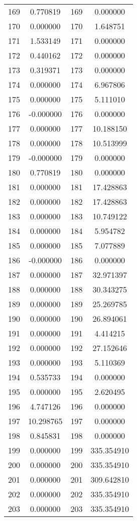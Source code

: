 \documentclass[12pt]{article}
\begin{document}
\begin{longtable}{@{}cccc@{}}
169 & 0.770819 & 169 & 0.000000 \\
170 & 0.000000 & 170 & 1.648751 \\
171 & 1.533149 & 171 & 0.000000 \\
172 & 0.440162 & 172 & 0.000000 \\
173 & 0.319371 & 173 & 0.000000 \\
174 & 0.000000 & 174 & 6.967806 \\
175 & 0.000000 & 175 & 5.111010 \\
176 & -0.000000 & 176 & 0.000000 \\
177 & 0.000000 & 177 & 10.188150 \\
178 & 0.000000 & 178 & 10.513999 \\
179 & -0.000000 & 179 & 0.000000 \\
180 & 0.770819 & 180 & 0.000000 \\
181 & 0.000000 & 181 & 17.428863 \\
182 & 0.000000 & 182 & 17.428863 \\
183 & 0.000000 & 183 & 10.749122 \\
184 & 0.000000 & 184 & 5.954782 \\
185 & 0.000000 & 185 & 7.077889 \\
186 & -0.000000 & 186 & 0.000000 \\
187 & 0.000000 & 187 & 32.971397 \\
188 & 0.000000 & 188 & 30.343275 \\
189 & 0.000000 & 189 & 25.269785 \\
190 & 0.000000 & 190 & 26.894061 \\
191 & 0.000000 & 191 & 4.414215 \\
192 & 0.000000 & 192 & 27.152646 \\
193 & 0.000000 & 193 & 5.110369 \\
194 & 0.535733 & 194 & 0.000000 \\
195 & 0.000000 & 195 & 2.620495 \\
196 & 4.747126 & 196 & 0.000000 \\
197 & 10.298765 & 197 & 0.000000 \\
198 & 0.845831 & 198 & 0.000000 \\
199 & 0.000000 & 199 & 335.354910 \\
200 & 0.000000 & 200 & 335.354910 \\
201 & 0.000000 & 201 & 309.642810 \\
202 & 0.000000 & 202 & 335.354910 \\
203 & 0.000000 & 203 & 335.354910 \\

\end{longtable}
\end{document}
